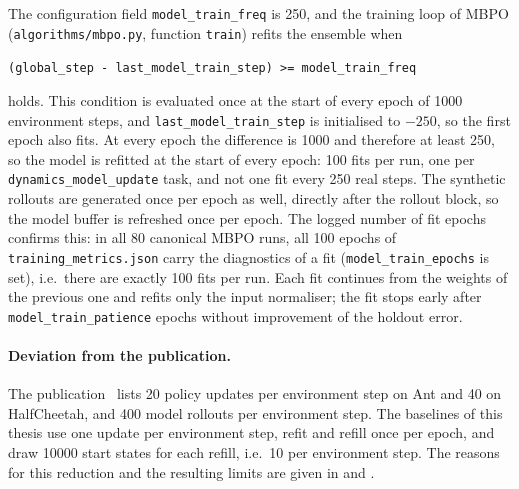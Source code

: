 The configuration field \texttt{model\_train\_freq} is \num{250}, and the training loop of MBPO (\texttt{algorithms/mbpo.py}, function \texttt{train}) refits the ensemble when
\begin{center}
  \footnotesize\texttt{(global\_step - last\_model\_train\_step) >= model\_train\_freq}
\end{center}
holds.
This condition is evaluated once at the start of every epoch of \num{1000} environment steps, and \texttt{last\_model\_train\_step} is initialised to $-250$, so the first epoch also fits.
At every epoch the difference is \num{1000} and therefore at least \num{250}, so the model is refitted at the start of every epoch: \num{100} fits per run, one per \texttt{dynamics\_model\_update} task, and not one fit every \num{250} real steps.
The synthetic rollouts are generated once per epoch as well, directly after the rollout block, so the model buffer is refreshed once per epoch.
The logged number of fit epochs confirms this: in all \num{80} canonical MBPO runs, all \num{100} epochs of \texttt{training\_metrics.json} carry the diagnostics of a fit (\texttt{model\_train\_epochs} is set), i.e.\ there are exactly \num{100} fits per run.
Each fit continues from the weights of the previous one and refits only the input normaliser; the fit stops early after \texttt{model\_train\_patience} epochs without improvement of the holdout error.

\paragraph{Deviation from the publication.} The publication~\cite{janner2019mbpo} lists \num{20} policy updates per environment step on Ant and \num{40} on HalfCheetah, and \num{400} model rollouts per environment step.
The baselines of this thesis use one update per environment step, refit and refill once per epoch, and draw \num{10000} start states for each refill, i.e.\ \num{10} per environment step.
The reasons for this reduction and the resulting limits are given in  and .

